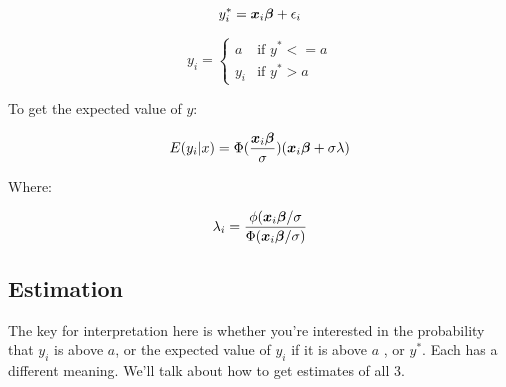 \documentclass[12 pt]{article}
\begin{document}
\begin{equation}
  \label{eq:5}
 y^*_i=\boldsymbol{x}_i\boldsymbol{\beta} +\epsilon_i
\end{equation}

\begin{equation}
  \label{eq:6}
y_i= \begin{cases}a & \mbox{if } y^*<=a \\
y_i & \mbox{if } y^*>a \end{cases}
\end{equation}

To get the expected value of $y$:

\begin{equation}
  \label{eq:7}
  E(y_i|x)=\Phi(\frac{\boldsymbol{x}_i\boldsymbol{\beta}}{\sigma})(\boldsymbol{x}_i\boldsymbol{\beta} +\sigma \lambda)
\end{equation}

Where:

\begin{equation}
  \label{eq:8}
 \lambda_i=\frac{\phi(\boldsymbol{x}_i\boldsymbol{\beta}/\sigma}{ \Phi(\boldsymbol{x}_i\boldsymbol{\beta}/\sigma)} 
\end{equation}

\subsection{Estimation}

The key for interpretation here is whether you're interested in the probability that $y_i$ is above $a$, or the expected value of $y_i$ if it is above $a$ , or $y^*$. Each has a different meaning. We'll talk about how to get estimates of all 3. 
\end{document}
